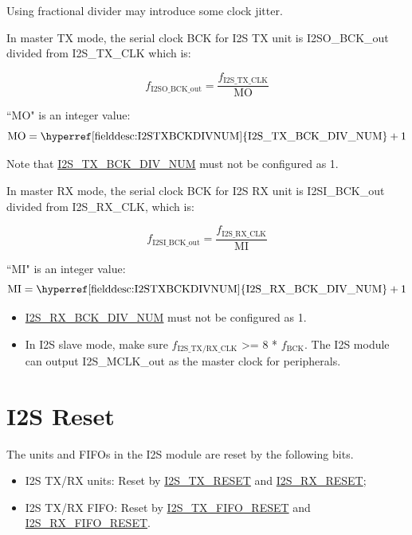 \documentclass[main\_\_EN.tex]{subfiles}
\begin{document}
\begin{tiplisting}
Using fractional divider may introduce some clock jitter.
\end{tiplisting}

In master TX mode, the serial clock BCK for I2S TX unit is I2SO\_BCK\_out divided from I2S\_TX\_CLK which is:

$$f_{\textrm{I2SO\_BCK\_out}} = \frac{f_{\textrm{I2S\_TX\_CLK}}}{\textrm{MO}}$$

``MO" is an integer value:
$$ \textrm{MO} = \textrm{\hyperref[fielddesc:I2STXBCKDIVNUM]{I2S\_TX\_BCK\_DIV\_NUM}} + 1 $$

\vspace{-1em}
\begin{tiplisting}
Note that \hyperref[fielddesc:I2STXBCKDIVNUM]{I2S\_TX\_BCK\_DIV\_NUM} must not be configured as 1.
\end{tiplisting}

In master RX mode, the serial clock BCK for I2S RX unit is I2SI\_BCK\_out divided from I2S\_RX\_CLK, which is:

$$f_{\textrm{I2SI\_BCK\_out}} = \frac{f_{\textrm{I2S\_RX\_CLK}}}{\textrm{MI}}$$

``MI" is an integer value:
$$ \textrm{MI} = \textrm{\hyperref[fielddesc:I2STXBCKDIVNUM]{I2S\_RX\_BCK\_DIV\_NUM}} + 1 $$

\begin{tiplisting}
\vspace{-2em}
\begin{itemize}
    \item \hyperref[fielddesc:I2SRXBCKDIVNUM]{I2S\_RX\_BCK\_DIV\_NUM} must not be configured as 1.
    \item In I2S slave mode, make sure $f_{\textrm{I2S\_TX/RX\_CLK}}$ >= 8 * $f_{\textrm{BCK}}$. The I2S module can output I2S\_MCLK\_out as the master clock for peripherals.
\end{itemize}
\end{tiplisting}

\section{I2S Reset}\label{sec:i2s-reset}

The units and FIFOs in the I2S module are reset by the following bits.

\begin{itemize}
\item I2S TX/RX units: Reset by \hyperref[fielddesc:I2STXRESET]{I2S\_TX\_RESET} and  \hyperref[fielddesc:I2SRXRESET]{I2S\_RX\_RESET};
\item I2S TX/RX FIFO: Reset by \hyperref[fielddesc:I2STXFIFORESET]{I2S\_TX\_FIFO\_RESET} and \hyperref[fielddesc:I2SRXFIFORESET]{I2S\_RX\_FIFO\_RESET}.
\end{itemize}
\end{document}
